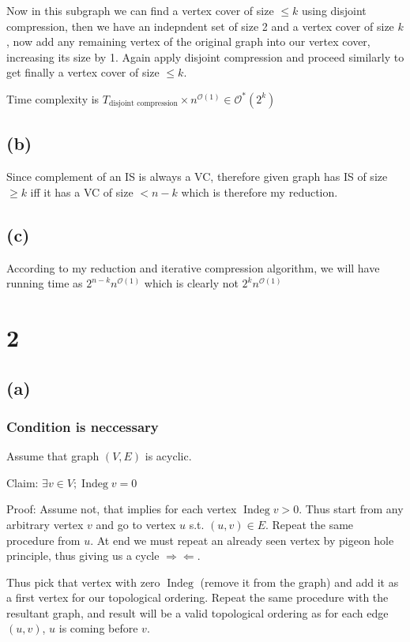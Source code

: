 \documentclass[12pt,3p]{elsarticle}
\newcommand{\contradiction}{
  \Rightarrow\!\Leftarrow
}
\begin{document}
Now in this subgraph we can find a vertex cover of size $\leq k$ using disjoint compression, then we have an indepndent set of size 2 and a vertex cover of size $k$, now add any remaining vertex of the original graph into our vertex cover, increasing its size by 1. Again apply disjoint compression and proceed similarly to get finally a vertex cover of size $\leq k$.  

Time complexity is $T_{\text{disjoint compression}} \times n^{\mathcal{O}(1)} \in \mathcal{O}^*(2^k)$

\subsection{(b)}

Since complement of an IS is always a VC, therefore given graph has IS of size $\geq k$ iff it has a VC of size $< n - k$ which is therefore my reduction.

\subsection{(c)}

According to my reduction and iterative compression algorithm, we will have running time as $2^{n - k}n^{\mathcal{O}(1)}$ which is clearly not ${2^{k}n^{\mathcal{O}(1)}}$

\section{2}

\subsection{(a)}

\subsubsection{Condition is neccessary}
Assume that graph $(V, E)$ is acyclic. 

Claim: $\exists v \in V; \operatorname{Indeg} v = 0$

Proof: Assume not, that implies for each vertex $\operatorname{Indeg} v > 0$. Thus start from any arbitrary vertex $v$ and go to vertex $u$ s.t. $(u, v) \in E$. Repeat the same procedure from $u$. At end we must repeat an already seen vertex by pigeon hole principle, thus giving us a cycle $\contradiction$.

Thus pick that vertex with zero $\operatorname{Indeg}$ (remove it from the graph) and add it as a first vertex for our topological ordering. Repeat the same procedure with the resultant graph, and result will be a valid topological ordering as for each edge $(u, v)$, $u$ is coming before $v$.
\end{document}
